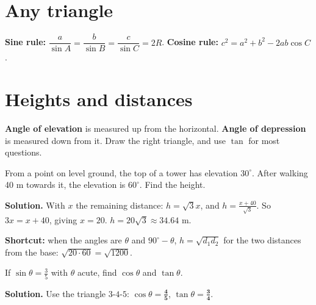 \documentclass[11pt,a4paper,openany]{report}
\begin{document}
\section{Any triangle}
\textbf{Sine rule:} $\dfrac a{\sin A}=\dfrac b{\sin B}=\dfrac c{\sin C}=2R$. \textbf{Cosine rule:} $c^2=a^2+b^2-2ab\cos C$.

\section{Heights and distances}
\textbf{Angle of elevation} is measured up from the horizontal. \textbf{Angle of depression} is measured down from it. Draw the right triangle, and use $\tan$ for most questions.
\begin{center}
\end{center}

\begin{example}
From a point on level ground, the top of a tower has elevation $30^\circ$. After walking 40 m towards it, the elevation is $60^\circ$. Find the height.

\textbf{Solution.} With $x$ the remaining distance: $h=\sqrt3x$, and $h=\frac{x+40}{\sqrt3}$. So $3x=x+40$, giving $x=20$. $h=20\sqrt3\approx\mathbf{34.64}$ m.

\textbf{Shortcut:} when the angles are $\theta$ and $90^\circ-\theta$, $h=\sqrt{d_1d_2}$ for the two distances from the base: $\sqrt{20\cdot60}=\sqrt{1200}$. \checkmark
\end{example}

\begin{example}
If $\sin\theta=\frac35$ with $\theta$ acute, find $\cos\theta$ and $\tan\theta$.

\textbf{Solution.} Use the triangle $3$-$4$-$5$: $\cos\theta=\mathbf{\frac45}$, $\tan\theta=\mathbf{\frac34}$.
\end{example}
\end{document}
